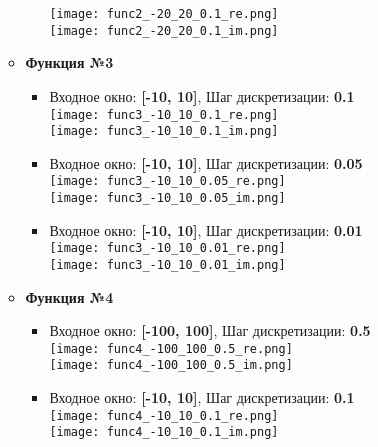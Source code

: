 \documentclass[11pt]{article}
\begin{document}
\begin{itemize}
\begin{itemize}
\begin{itemize}
					\texttt{[image: func2\_-20\_20\_0.1\_re.png]}\\
					\texttt{[image: func2\_-20\_20\_0.1\_im.png]}\\
			\end{itemize}
		\item \textbf{Функция №3}
			\begin{itemize}	
				\item Входное окно: \textbf{[-10, 10]}, Шаг дискретизации: \textbf{0.1} \medskip \\
					\texttt{[image: func3\_-10\_10\_0.1\_re.png]}\\
					\texttt{[image: func3\_-10\_10\_0.1\_im.png]}\\
				\item Входное окно: \textbf{[-10, 10]}, Шаг дискретизации: \textbf{0.05} \medskip \\
					\texttt{[image: func3\_-10\_10\_0.05\_re.png]}\\
					\texttt{[image: func3\_-10\_10\_0.05\_im.png]}\\
					\newpage
				\item Входное окно: \textbf{[-10, 10]}, Шаг дискретизации: \textbf{0.01} \medskip \\
					\texttt{[image: func3\_-10\_10\_0.01\_re.png]}\\
					\texttt{[image: func3\_-10\_10\_0.01\_im.png]}\\
			\end{itemize}
		\item \textbf{Функция №4}	
			\begin{itemize}
				\item Входное окно: \textbf{[-100, 100]}, Шаг дискретизации: \textbf{0.5} \medskip \\
					\texttt{[image: func4\_-100\_100\_0.5\_re.png]}\\
					\texttt{[image: func4\_-100\_100\_0.5\_im.png]}\\
				\item Входное окно: \textbf{[-10, 10]}, Шаг дискретизации: \textbf{0.1} \medskip \\
					\texttt{[image: func4\_-10\_10\_0.1\_re.png]}\\
					\texttt{[image: func4\_-10\_10\_0.1\_im.png]}\\
			\end{itemize}
	\end{itemize}
\end{itemize}
\end{document}
